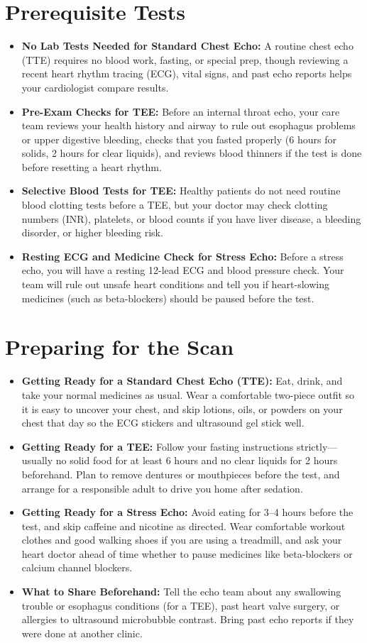 \section{Prerequisite Tests}
\begin{itemize}
\item \textbf{No Lab Tests Needed for Standard Chest Echo:} A routine chest echo (TTE) requires no blood work, fasting, or special prep, though reviewing a recent heart rhythm tracing (ECG), vital signs, and past echo reports helps your cardiologist compare results.
\item \textbf{Pre-Exam Checks for TEE:} Before an internal throat echo, your care team reviews your health history and airway to rule out esophagus problems or upper digestive bleeding, checks that you fasted properly (6 hours for solids, 2 hours for clear liquids), and reviews blood thinners if the test is done before resetting a heart rhythm.
\item \textbf{Selective Blood Tests for TEE:} Healthy patients do not need routine blood clotting tests before a TEE, but your doctor may check clotting numbers (INR), platelets, or blood counts if you have liver disease, a bleeding disorder, or higher bleeding risk.
\item \textbf{Resting ECG and Medicine Check for Stress Echo:} Before a stress echo, you will have a resting 12-lead ECG and blood pressure check. Your team will rule out unsafe heart conditions and tell you if heart-slowing medicines (such as beta-blockers) should be paused before the test.
\end{itemize}


\section{Preparing for the Scan}
\begin{itemize}
\item \textbf{Getting Ready for a Standard Chest Echo (TTE):} Eat, drink, and take your normal medicines as usual. Wear a comfortable two-piece outfit so it is easy to uncover your chest, and skip lotions, oils, or powders on your chest that day so the ECG stickers and ultrasound gel stick well.
\item \textbf{Getting Ready for a TEE:} Follow your fasting instructions strictly---usually no solid food for at least 6 hours and no clear liquids for 2 hours beforehand. Plan to remove dentures or mouthpieces before the test, and arrange for a responsible adult to drive you home after sedation.
\item \textbf{Getting Ready for a Stress Echo:} Avoid eating for 3--4 hours before the test, and skip caffeine and nicotine as directed. Wear comfortable workout clothes and good walking shoes if you are using a treadmill, and ask your heart doctor ahead of time whether to pause medicines like beta-blockers or calcium channel blockers.
\item \textbf{What to Share Beforehand:} Tell the echo team about any swallowing trouble or esophagus conditions (for a TEE), past heart valve surgery, or allergies to ultrasound microbubble contrast. Bring past echo reports if they were done at another clinic.
\end{itemize}


